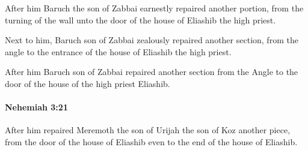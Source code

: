 			\begin{versebox}
					\item[BHS] 
					\item[LXX] 
					\item[ASV] After him Baruch the son of Zabbai earnestly repaired another portion, from the turning of the wall unto the door of the house of Eliashib the high priest.
					\item[NIV] Next to him, Baruch son of Zabbai zealously repaired another section, from the angle to the entrance of the house of Eliashib the high priest.
					\item[NRSV] After him Baruch son of Zabbai repaired another section from the Angle to the door of the house of the high priest Eliashib.
			\end{versebox}

		\paragraph{Nehemiah 3:21} %
			\label{NEHEMIAH-3-21}

			After him repaired Meremoth the son of Urijah the son of Koz another piece, from the door of the house of Eliashib even to the end of the house of Eliashib.

